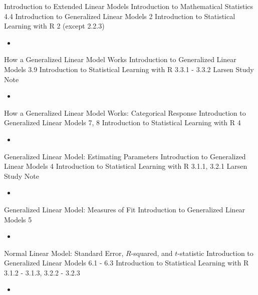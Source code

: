 \begin{CHPT_SUMM_AUTO_NUMB}[label = {L.-42}]{Introduction to Extended Linear Models}
Introduction to Mathematical Statistics 4.4
Introduction to Generalized Linear Models 2
Introduction to Statistical Learning with R 2 (except 2.2.3)
	\begin{itemize}
		\item	
	\end{itemize}
\end{CHPT_SUMM_AUTO_NUMB}

\begin{CHPT_SUMM_AUTO_NUMB}[label = {L.-43}]{How a Generalized Linear Model Works}
Introduction to Generalized Linear Models 3.9
Introduction to Statistical Learning with R 3.3.1 - 3.3.2
Larsen Study Note
	\begin{itemize}
		\item	
	\end{itemize}
\end{CHPT_SUMM_AUTO_NUMB}

\begin{CHPT_SUMM_AUTO_NUMB}[label = {L.-44}]{How a Generalized Linear Model Works: Categorical Response}
Introduction to Generalized Linear Models 7, 8
Introduction to Statistical Learning with R 4
	\begin{itemize}
		\item	
	\end{itemize}
\end{CHPT_SUMM_AUTO_NUMB}

\begin{CHPT_SUMM_AUTO_NUMB}[label = {L.-45}]{Generalized Linear Model: Estimating Parameters}
Introduction to Generalized Linear Models 4
Introduction to Statistical Learning with R 3.1.1, 3.2.1
Larsen Study Note
	\begin{itemize}
		\item	
	\end{itemize}
\end{CHPT_SUMM_AUTO_NUMB}

\begin{CHPT_SUMM_AUTO_NUMB}[label = {L.-46}]{Generalized Linear Model: Measures of Fit}
Introduction to Generalized Linear Models 5
	\begin{itemize}
		\item	
	\end{itemize}
\end{CHPT_SUMM_AUTO_NUMB}

\begin{CHPT_SUMM_AUTO_NUMB}[label = {L.-47}]{{Normal Linear Model: Standard Error, $R$-squared, and $t$-statistic}}
Introduction to Generalized Linear Models 6.1 - 6.3
Introduction to Statistical Learning with R 3.1.2 - 3.1.3, 3.2.2 - 3.2.3
	\begin{itemize}
		\item	
	\end{itemize}
\end{CHPT_SUMM_AUTO_NUMB}

